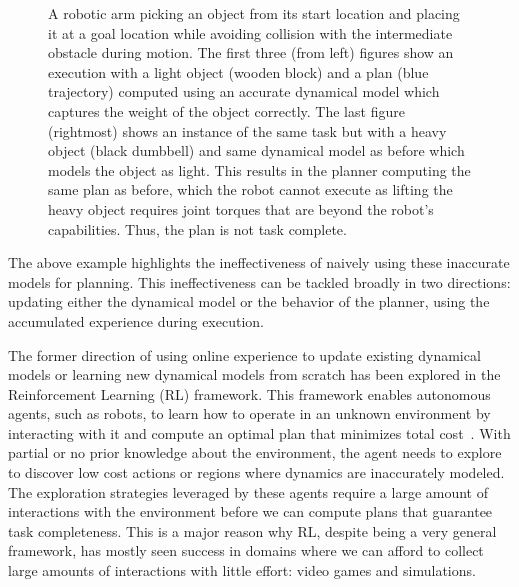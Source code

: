 \begin{figure}[t]
\begin{subfigure}{0.24\linewidth}
  \end{subfigure}
  \caption{A robotic arm picking an object from its start location and
  placing it at a goal location while avoiding collision with the
  intermediate obstacle during motion. The first three (from left)
  figures show an execution with a light object (wooden block) and a
  plan (blue trajectory) computed
  using an accurate dynamical model which captures the weight of the
  object correctly. The last figure (rightmost) shows an instance of
  the same task but with a heavy object (black dumbbell) and same
  dynamical model as before which models the object as light. This
  results in the planner computing the same plan as before, which the
  robot cannot execute as lifting the heavy object requires joint
  torques that are beyond the robot's capabilities. Thus, the plan is
  not task complete.}
  \label{fig:intro-example}
\end{figure}
The above example highlights the ineffectiveness of naively using
these inaccurate models for planning. This ineffectiveness can be
tackled broadly in two directions: updating either the dynamical
model or the behavior of the planner, using the accumulated
experience during execution.

The former direction of using online
experience to update existing dynamical models or learning new
dynamical models from scratch has been explored in the Reinforcement
Learning (RL) framework. This framework enables autonomous agents,
such as robots, to learn how to operate in an unknown environment by
interacting with it and compute an optimal plan that minimizes total
cost~\cite{sutton1998introduction}. With partial or no prior knowledge
about the environment, the agent needs to explore to discover low cost
actions or regions where dynamics are inaccurately modeled. The
exploration strategies leveraged by these agents require a large
amount of interactions with the environment before we can compute
plans that guarantee task completeness. This is a major reason why RL,
despite being a very general framework, has mostly seen success in
domains where we can afford to collect large amounts of interactions
with little effort: video games and simulations.


